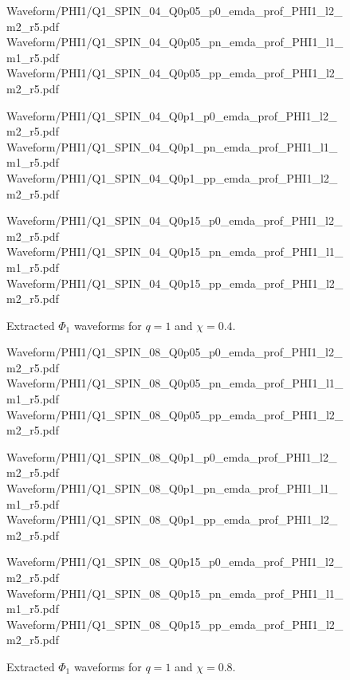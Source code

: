 \begin{figure}[p]
\centering

{Waveform/PHI1/Q1_SPIN_04_Q0p05_p0_emda_prof_PHI1_l2_m2_r5.pdf}
\hfill
{}
{Waveform/PHI1/Q1_SPIN_04_Q0p05_pn_emda_prof_PHI1_l1_m1_r5.pdf}
\hfill
{}
{Waveform/PHI1/Q1_SPIN_04_Q0p05_pp_emda_prof_PHI1_l2_m2_r5.pdf}

\vspace{0.6em}

{Waveform/PHI1/Q1_SPIN_04_Q0p1_p0_emda_prof_PHI1_l2_m2_r5.pdf}
\hfill
{}
{Waveform/PHI1/Q1_SPIN_04_Q0p1_pn_emda_prof_PHI1_l1_m1_r5.pdf}
\hfill
{}
{Waveform/PHI1/Q1_SPIN_04_Q0p1_pp_emda_prof_PHI1_l2_m2_r5.pdf}

\vspace{0.6em}

{Waveform/PHI1/Q1_SPIN_04_Q0p15_p0_emda_prof_PHI1_l2_m2_r5.pdf}
\hfill
{}
{Waveform/PHI1/Q1_SPIN_04_Q0p15_pn_emda_prof_PHI1_l1_m1_r5.pdf}
\hfill
{}
{Waveform/PHI1/Q1_SPIN_04_Q0p15_pp_emda_prof_PHI1_l2_m2_r5.pdf}

\caption{Extracted \(\Phi_1\) waveforms for \(q=1\) and \(\chi=0.4\).}
\label{fig:phi1_catalog_q1_chi04}
\end{figure}

\begin{figure}[p]
\centering

{Waveform/PHI1/Q1_SPIN_08_Q0p05_p0_emda_prof_PHI1_l2_m2_r5.pdf}
\hfill
{}
{Waveform/PHI1/Q1_SPIN_08_Q0p05_pn_emda_prof_PHI1_l1_m1_r5.pdf}
\hfill
{}
{Waveform/PHI1/Q1_SPIN_08_Q0p05_pp_emda_prof_PHI1_l2_m2_r5.pdf}

\vspace{0.6em}

{Waveform/PHI1/Q1_SPIN_08_Q0p1_p0_emda_prof_PHI1_l2_m2_r5.pdf}
\hfill
{}
{Waveform/PHI1/Q1_SPIN_08_Q0p1_pn_emda_prof_PHI1_l1_m1_r5.pdf}
\hfill
{}
{Waveform/PHI1/Q1_SPIN_08_Q0p1_pp_emda_prof_PHI1_l2_m2_r5.pdf}

\vspace{0.6em}

{Waveform/PHI1/Q1_SPIN_08_Q0p15_p0_emda_prof_PHI1_l2_m2_r5.pdf}
\hfill
{}
{Waveform/PHI1/Q1_SPIN_08_Q0p15_pn_emda_prof_PHI1_l1_m1_r5.pdf}
\hfill
{}
{Waveform/PHI1/Q1_SPIN_08_Q0p15_pp_emda_prof_PHI1_l2_m2_r5.pdf}

\caption{Extracted \(\Phi_1\) waveforms for \(q=1\) and \(\chi=0.8\).}
\label{fig:phi1_catalog_q1_chi08}
\end{figure}

